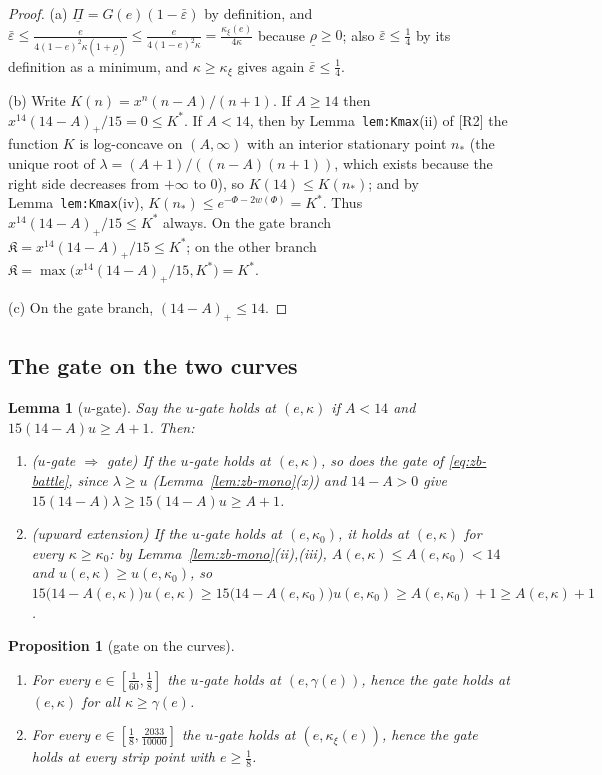 \documentclass[11pt]{article}
\newtheorem{lemma}[theorem]{Lemma}
\newtheorem{proposition}[theorem]{Proposition}
\theoremstyle{remark}
\theoremstyle{plain}
\theoremstyle{plain}
\newcommand{\eps}{\varepsilon}
\newcommand{\Kfrak}{\mathfrak K}
\newcommand{\Kstar}{K^{*}}
\newcommand{\kxi}{\kappa_\xi}
\newcommand{\epsbar}{\bar\eps}
\newcommand{\RII}{[R2]}
\begin{document}
\begin{proof}
(a) $\underline\Pi=G(e)(1-\epsbar)$ by definition, and
$\epsbar\le\frac e{4(1-e)^2\kappa(1+\underline\rho)}
\le\frac e{4(1-e)^2\kappa}=\frac{\kxi(e)}{4\kappa}$ because
$\underline\rho\ge0$; also $\epsbar\le\tfrac14$ by its definition as a
minimum, and $\kappa\ge\kxi$ gives again $\epsbar\le\tfrac14$.

(b) Write $K(n)=x^n(n-A)/(n+1)$.  If $A\ge14$ then
$x^{14}(14-A)_+/15=0\le\Kstar$.  If $A<14$, then by
Lemma~\texttt{lem:Kmax}(ii) of \RII{} the function $K$ is log-concave on
$(A,\infty)$ with an interior stationary point $n_*$ (the unique root of
$\lambda=(A+1)/((n-A)(n+1))$, which exists because the right side decreases
from $+\infty$ to $0$), so $K(14)\le K(n_*)$; and by
Lemma~\texttt{lem:Kmax}(iv), $K(n_*)\le e^{-\Phi-2w(\Phi)}=\Kstar$.  Thus
$x^{14}(14-A)_+/15\le\Kstar$ always.  On the gate branch
$\Kfrak=x^{14}(14-A)_+/15\le\Kstar$; on the other branch
$\Kfrak=\max\bigl(x^{14}(14-A)_+/15,\Kstar\bigr)=\Kstar$.

(c) On the gate branch, $(14-A)_+\le14$.
\end{proof}

\subsection{The gate on the two curves}

\begin{lemma}[$u$-gate]\label{lem:zb-ugate}
Say the \emph{$u$-gate} holds at $(e,\kappa)$ if $A<14$ and
$15(14-A)u\ge A+1$.  Then:
\begin{enumerate}[label=\textup{(\alph*)},itemsep=1pt]
\item ($u$-gate $\Rightarrow$ gate)  If the $u$-gate holds at $(e,\kappa)$,
so does the gate of \eqref{eq:zb-battle}, since
$\lambda\ge u$ (Lemma~\ref{lem:zb-mono}(x)) and $14-A>0$ give
$15(14-A)\lambda\ge15(14-A)u\ge A+1$.
\item (upward extension)  If the $u$-gate holds at $(e,\kappa_0)$, it holds
at $(e,\kappa)$ for every $\kappa\ge\kappa_0$: by
Lemma~\ref{lem:zb-mono}(ii),(iii), $A(e,\kappa)\le A(e,\kappa_0)<14$ and
$u(e,\kappa)\ge u(e,\kappa_0)$, so
$15\bigl(14-A(e,\kappa)\bigr)u(e,\kappa)
\ge15\bigl(14-A(e,\kappa_0)\bigr)u(e,\kappa_0)\ge A(e,\kappa_0)+1\ge
A(e,\kappa)+1$. \qedhere
\end{enumerate}
\end{lemma}

\begin{proposition}[gate on the curves]\label{prop:zb-gate}
\begin{enumerate}[label=\textup{(\alph*)},itemsep=1pt]
\item For every $e\in[\tfrac1{60},\tfrac18]$ the $u$-gate holds at
$(e,\gamma(e))$, hence the gate holds at $(e,\kappa)$ for all
$\kappa\ge\gamma(e)$.
\item For every $e\in[\tfrac18,\tfrac{2033}{10000}]$ the $u$-gate holds at
$(e,\kxi(e))$, hence the gate holds at every strip point with
$e\ge\tfrac18$.
\end{enumerate}
\end{proposition}
\end{document}
